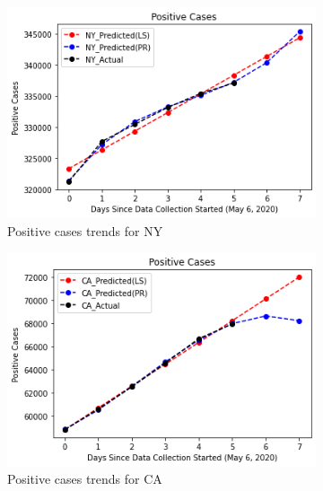 \documentclass[11pt]{article}
\begin{document}
\FloatBarrier
\begin{figure}[h]
     \centering
     \begin{subfigure}[b]{0.49\textwidth}
         \centering
         \includegraphics[width=\textwidth]{diagrams/analysis/positive_trend_NY.png}
         \caption{Positive cases trends for NY}
     \end{subfigure}
     \begin{subfigure}[b]{0.49\textwidth}
         \centering
         \includegraphics[width=\textwidth]{diagrams/analysis/positive_trend_CA.png}
         \caption{Positive cases trends for CA}
     \end{subfigure}
        \label{fig:three graphs}
             \begin{subfigure}[b]{0.49\textwidth}
         \centering

\end{subfigure}
\end{figure}
\end{document}
